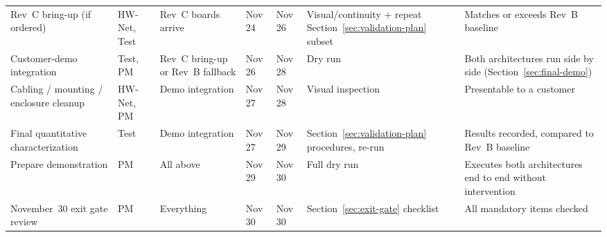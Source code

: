 \begin{landscape}
\begin{center}
\begin{longtable}{@{}p{4.0cm} p{1.9cm} p{2.6cm} p{1.4cm} p{1.5cm} p{4.3cm} p{4.3cm}@{}}
\midrule
Rev~C bring-up (if ordered) & HW-Net, Test & Rev~C boards arrive & Nov 24 & Nov 26 & Visual/continuity + repeat Section~\ref{sec:validation-plan} subset & Matches or exceeds Rev~B baseline \\
Customer-demo integration & Test, PM & Rev~C bring-up or Rev~B fallback & Nov 26 & Nov 28 & Dry run & Both architectures run side by side (Section~\ref{sec:final-demo}) \\
Cabling / mounting / enclosure cleanup & HW-Net, PM & Demo integration & Nov 27 & Nov 28 & Visual inspection & Presentable to a customer \\
Final quantitative characterization & Test & Demo integration & Nov 27 & Nov 29 & Section~\ref{sec:validation-plan} procedures, re-run & Results recorded, compared to Rev~B baseline \\
Prepare demonstration & PM & All above & Nov 29 & Nov 30 & Full dry run & Executes both architectures end to end without intervention \\
November~30 exit gate review & PM & Everything & Nov 30 & Nov 30 & Section~\ref{sec:exit-gate} checklist & All mandatory items checked \\
\bottomrule
\end{longtable}
\end{center}
\end{landscape}
